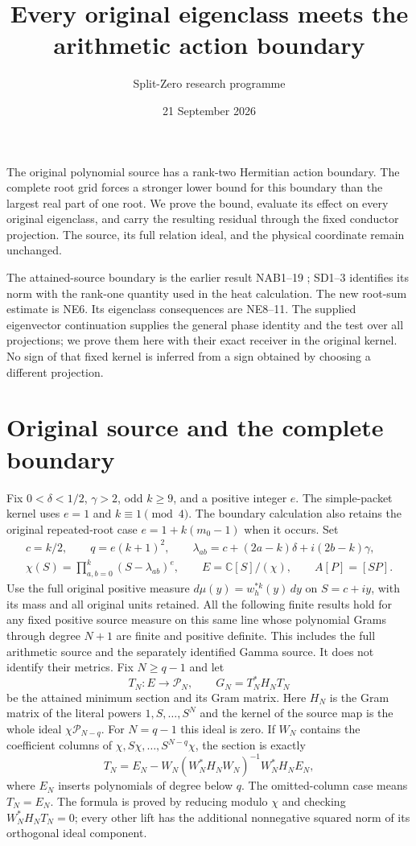 \documentclass[11pt]{article}
\title{Every original eigenclass meets the arithmetic action boundary}
\author{Split-Zero research programme}
\date{21 September 2026}
\newcommand{\C}{\mathbb C}
\begin{document}
\maketitle

The original polynomial source has a rank-two Hermitian action boundary.
The complete root grid forces a stronger lower bound for this boundary
than the largest real part of one root. We prove the bound, evaluate its
effect on every original eigenclass, and carry the resulting residual
through the fixed conductor projection. The source, its full relation
ideal, and the physical coordinate remain unchanged.

The attained-source boundary is the earlier result NAB1--19
\cite{NAB}; SD1--3 \cite{SD} identifies its norm with the rank-one
quantity used in the heat calculation. The new root-sum estimate is
NE6. Its eigenclass consequences are NE8--11. The supplied eigenvector
continuation \cite[(38)--(41)]{Incoming} supplies the general phase
identity and the test over all projections; we prove them here with
their exact receiver in the original kernel. No sign of that fixed
kernel is inferred from a sign obtained by choosing a different projection.

\section{Original source and the complete boundary}
Fix $0<\delta<1/2$, $\gamma>2$, odd $k\ge9$, and a positive integer
$e$. The simple-packet kernel uses $e=1$ and $k\equiv1\pmod4$.
The boundary calculation also retains the original repeated-root
case $e=1+k(m_0-1)$ when it occurs. Set
\begin{equation}\tag{NE1}
\begin{gathered}
c=k/2,\qquad q=e(k+1)^2,\qquad
\lambda_{ab}=c+(2a-k)\delta+i(2b-k)\gamma,\\
\chi(S)=\prod_{a,b=0}^k(S-\lambda_{ab})^e,\qquad
E=\C[S]/(\chi),\qquad A[P]=[SP].
\end{gathered}
\end{equation}
Use the full original positive measure $d\mu(y)=w_h^{*k}(y)\,dy$
on $S=c+iy$, with its mass and all original units retained.
All the following finite results hold for any fixed positive source
measure on this same line whose polynomial Grams through degree $N+1$
are finite and positive definite. This includes the full arithmetic
source and the separately identified Gamma source. It does not identify
their metrics. Fix $N\ge q-1$ and let
\[
T_N:E\longrightarrow\mathcal P_N,
\qquad G_N=T_N^*H_NT_N
\]
be the attained minimum section and its Gram matrix. Here $H_N$ is the
Gram matrix of the literal powers $1,S,\ldots,S^N$ and the kernel of
the source map is the whole ideal $\chi\mathcal P_{N-q}$.
For $N=q-1$ this ideal is zero. If $W_N$ contains the coefficient
columns of $\chi,S\chi,\ldots,S^{N-q}\chi$, the section is exactly
\[
T_N=E_N-W_N(W_N^*H_NW_N)^{-1}W_N^*H_NE_N,
\]
where $E_N$ inserts polynomials of degree below $q$. The omitted-column
case means $T_N=E_N$. The formula is proved by reducing modulo $\chi$
and checking $W_N^*H_NT_N=0$; every other lift has the additional
nonnegative squared norm of its orthogonal ideal component.
\end{document}
